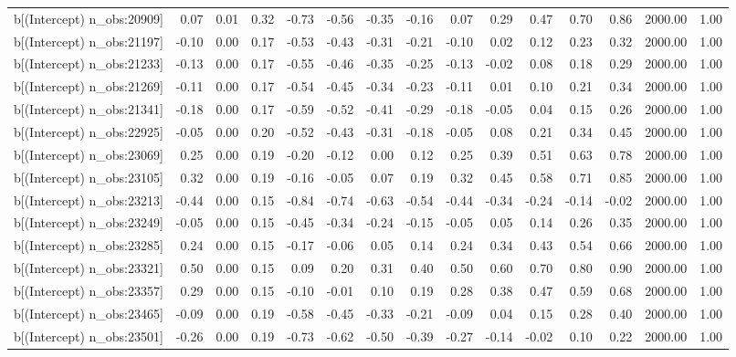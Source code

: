 \begin{table}[ht]
\begin{tabular}{rrrrrrrrrrrrrrr}
  b[(Intercept) n\_obs:20909] & 0.07 & 0.01 & 0.32 & -0.73 & -0.56 & -0.35 & -0.16 & 0.07 & 0.29 & 0.47 & 0.70 & 0.86 & 2000.00 & 1.00 \\ 
  b[(Intercept) n\_obs:21197] & -0.10 & 0.00 & 0.17 & -0.53 & -0.43 & -0.31 & -0.21 & -0.10 & 0.02 & 0.12 & 0.23 & 0.32 & 2000.00 & 1.00 \\ 
  b[(Intercept) n\_obs:21233] & -0.13 & 0.00 & 0.17 & -0.55 & -0.46 & -0.35 & -0.25 & -0.13 & -0.02 & 0.08 & 0.18 & 0.29 & 2000.00 & 1.00 \\ 
  b[(Intercept) n\_obs:21269] & -0.11 & 0.00 & 0.17 & -0.54 & -0.45 & -0.34 & -0.23 & -0.11 & 0.01 & 0.10 & 0.21 & 0.34 & 2000.00 & 1.00 \\ 
  b[(Intercept) n\_obs:21341] & -0.18 & 0.00 & 0.17 & -0.59 & -0.52 & -0.41 & -0.29 & -0.18 & -0.05 & 0.04 & 0.15 & 0.26 & 2000.00 & 1.00 \\ 
  b[(Intercept) n\_obs:22925] & -0.05 & 0.00 & 0.20 & -0.52 & -0.43 & -0.31 & -0.18 & -0.05 & 0.08 & 0.21 & 0.34 & 0.45 & 2000.00 & 1.00 \\ 
  b[(Intercept) n\_obs:23069] & 0.25 & 0.00 & 0.19 & -0.20 & -0.12 & 0.00 & 0.12 & 0.25 & 0.39 & 0.51 & 0.63 & 0.78 & 2000.00 & 1.00 \\ 
  b[(Intercept) n\_obs:23105] & 0.32 & 0.00 & 0.19 & -0.16 & -0.05 & 0.07 & 0.19 & 0.32 & 0.45 & 0.58 & 0.71 & 0.85 & 2000.00 & 1.00 \\ 
  b[(Intercept) n\_obs:23213] & -0.44 & 0.00 & 0.15 & -0.84 & -0.74 & -0.63 & -0.54 & -0.44 & -0.34 & -0.24 & -0.14 & -0.02 & 2000.00 & 1.00 \\ 
  b[(Intercept) n\_obs:23249] & -0.05 & 0.00 & 0.15 & -0.45 & -0.34 & -0.24 & -0.15 & -0.05 & 0.05 & 0.14 & 0.26 & 0.35 & 2000.00 & 1.00 \\ 
  b[(Intercept) n\_obs:23285] & 0.24 & 0.00 & 0.15 & -0.17 & -0.06 & 0.05 & 0.14 & 0.24 & 0.34 & 0.43 & 0.54 & 0.66 & 2000.00 & 1.00 \\ 
  b[(Intercept) n\_obs:23321] & 0.50 & 0.00 & 0.15 & 0.09 & 0.20 & 0.31 & 0.40 & 0.50 & 0.60 & 0.70 & 0.80 & 0.90 & 2000.00 & 1.00 \\ 
  b[(Intercept) n\_obs:23357] & 0.29 & 0.00 & 0.15 & -0.10 & -0.01 & 0.10 & 0.19 & 0.28 & 0.38 & 0.47 & 0.59 & 0.68 & 2000.00 & 1.00 \\ 
  b[(Intercept) n\_obs:23465] & -0.09 & 0.00 & 0.19 & -0.58 & -0.45 & -0.33 & -0.21 & -0.09 & 0.04 & 0.15 & 0.28 & 0.40 & 2000.00 & 1.00 \\ 
  b[(Intercept) n\_obs:23501] & -0.26 & 0.00 & 0.19 & -0.73 & -0.62 & -0.50 & -0.39 & -0.27 & -0.14 & -0.02 & 0.10 & 0.22 & 2000.00 & 1.00 \\ 

\end{tabular}
\end{table}
